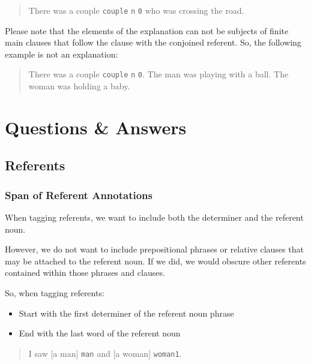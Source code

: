 \documentclass[
]{book}
\providecommand{\tightlist}{%
  \setlength{\itemsep}{0pt}\setlength{\parskip}{0pt}}
\begin{document}
\begin{quote}
There was a couple \texttt{couple} \texttt{n} \texttt{0} who was crossing the road.
\end{quote}

Please note that the elements of the explanation can not be subjects of finite main clauses that follow the clause with the conjoined referent. So, the following example is not an explanation:

\begin{quote}
There was a couple \texttt{couple} \texttt{n} \texttt{0}. The man was playing with a ball. The woman was holding a baby.
\end{quote}

\hypertarget{questions-answers}{%
\chapter{Questions \& Answers}\label{questions-answers}}

\hypertarget{referents-1}{%
\section{Referents}\label{referents-1}}

\hypertarget{span-of-referent-annotations}{%
\subsection{Span of Referent Annotations}\label{span-of-referent-annotations}}

When tagging referents,
we want to include both the determiner and the referent noun.

However,
we do not want to include prepositional phrases or relative clauses
that may be attached to the referent noun.
If we did, we would obscure other referents
contained within those phrases and clauses.

So, when tagging referents:

\begin{itemize}
\tightlist
\item
  Start with the first determiner of the referent noun phrase
\item
  End with the last word of the referent noun
\end{itemize}

\begin{quote}
I saw {[}a man{]} \texttt{man} and {[}a woman{]} \texttt{woman1}.
\end{quote}
\end{document}
